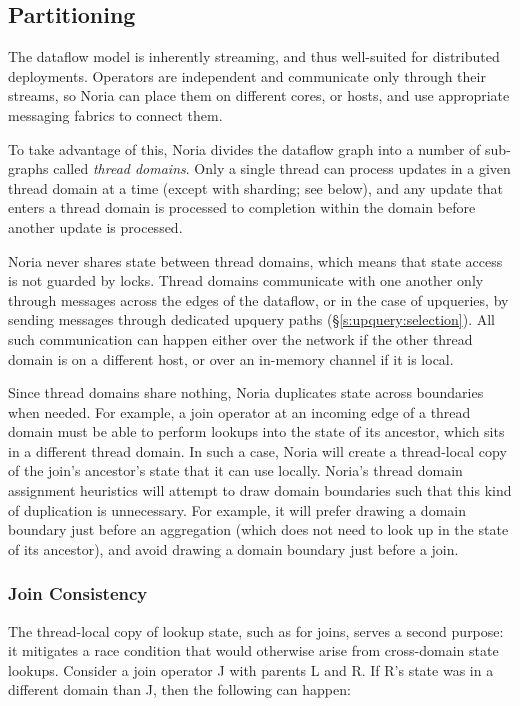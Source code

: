 \subsection{Partitioning}
\label{s:noria:partitioning}

The dataflow model is inherently streaming, and thus well-suited for distributed
deployments. Operators are independent and communicate only through their
streams, so Noria can place them on different cores, or hosts, and use
appropriate messaging fabrics to connect them.

To take advantage of this, Noria divides the dataflow graph into a number of
sub-graphs called \textit{thread domains}. Only a single thread can process
updates in a given thread domain at a time (except with sharding; see below),
and any update that enters a thread domain is processed to completion within
the domain before another update is processed.

Noria never shares state between thread domains, which means that state access
is not guarded by locks. Thread domains communicate with one another only
through messages across the edges of the dataflow, or in the case of upqueries,
by sending messages through dedicated upquery paths
(\S\ref{s:upquery:selection}). All such communication can happen either over the
network if the other thread domain is on a different host, or over an in-memory
channel if it is local.

Since thread domains share nothing, Noria duplicates state across boundaries
when needed. For example, a join operator at an incoming edge of a thread domain
must be able to perform lookups into the state of its ancestor, which sits in a
different thread domain. In such a case, Noria will create a thread-local copy
of the join's ancestor's state that it can use locally. Noria's thread domain
assignment heuristics will attempt to draw domain boundaries  such that this
kind of duplication is unnecessary. For example, it will prefer drawing a domain
boundary just before an aggregation (which does not need to look up in the state
of its ancestor), and avoid drawing a domain boundary just before a join.

\subsubsection{Join Consistency}
\label{s:join-state-dupe}

The thread-local copy of lookup state, such as for joins, serves a second
purpose: it mitigates a race condition that would otherwise arise from
cross-domain state lookups. Consider a join operator J with parents L and R. If
R's state was in a different domain than J, then the following can happen:

